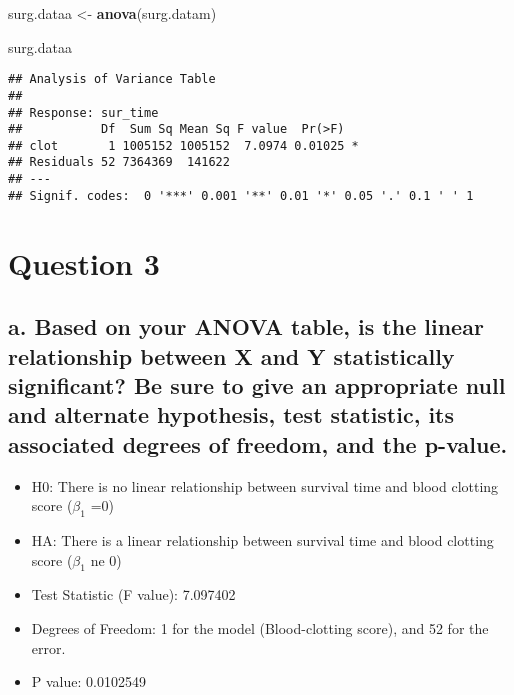 \documentclass[
]{article}
\newenvironment{Shaded}{\begin{snugshade}}{\end{snugshade}}
\newcommand{\FunctionTok}[1]{\textcolor[rgb]{0.13,0.29,0.53}{\textbf{#1}}}
\newcommand{\NormalTok}[1]{#1}
\newcommand{\OtherTok}[1]{\textcolor[rgb]{0.56,0.35,0.01}{#1}}
\begin{document}
\begin{Shaded}
\begin{Highlighting}[]
\NormalTok{surg.dataa }\OtherTok{\textless{}{-}} \FunctionTok{anova}\NormalTok{(surg.datam)}

\NormalTok{surg.dataa}
\end{Highlighting}
\end{Shaded}

\begin{verbatim}
## Analysis of Variance Table
## 
## Response: sur_time
##           Df  Sum Sq Mean Sq F value  Pr(>F)  
## clot       1 1005152 1005152  7.0974 0.01025 *
## Residuals 52 7364369  141622                  
## ---
## Signif. codes:  0 '***' 0.001 '**' 0.01 '*' 0.05 '.' 0.1 ' ' 1
\end{verbatim}

\hypertarget{question-3}{%
\section{Question 3}\label{question-3}}

\hypertarget{a.-based-on-your-anova-table-is-the-linear-relationship-between-x-and-y-statistically-significant-be-sure-to-give-an-appropriate-null-and-alternate-hypothesis-test-statistic-its-associated-degrees-of-freedom-and-the-p-value.}{%
\subsection{a. Based on your ANOVA table, is the linear relationship
between X and Y statistically significant? Be sure to give an
appropriate null and alternate hypothesis, test statistic, its
associated degrees of freedom, and the
p-value.}\label{a.-based-on-your-anova-table-is-the-linear-relationship-between-x-and-y-statistically-significant-be-sure-to-give-an-appropriate-null-and-alternate-hypothesis-test-statistic-its-associated-degrees-of-freedom-and-the-p-value.}}

\begin{itemize}
\item
  H0: There is no linear relationship between survival time and blood
  clotting score (\(\beta_1\) =0)
\item
  HA: There is a linear relationship between survival time and blood
  clotting score (\(\beta_1\) ne 0)
\item
  Test Statistic (F value): 7.097402
\item
  Degrees of Freedom: 1 for the model (Blood-clotting score), and 52 for
  the error.
\item
  P value: 0.0102549
\end{itemize}
\end{document}

